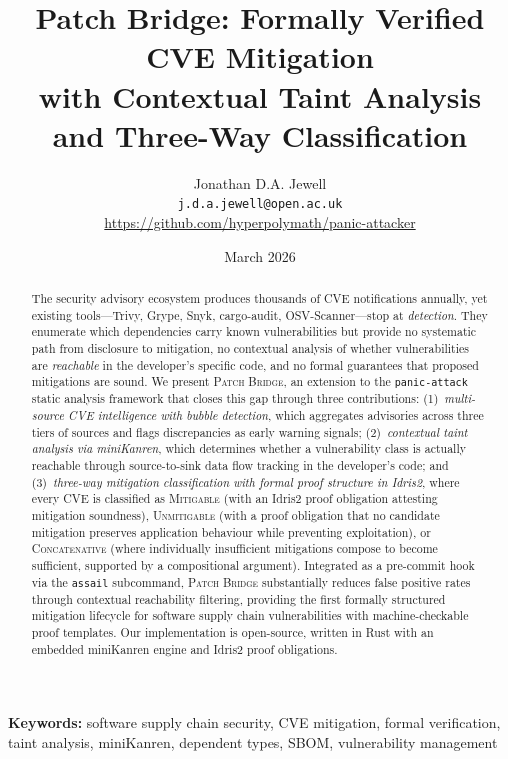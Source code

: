 \documentclass[11pt,twocolumn]{article}
\title{\textbf{Patch Bridge: Formally Verified CVE Mitigation\\
with Contextual Taint Analysis\\and Three-Way Classification}}
\author{
  Jonathan D.A. Jewell\\
  \texttt{j.d.a.jewell@open.ac.uk}\\
  \url{https://github.com/hyperpolymath/panic-attacker}
}
\date{March 2026}
\begin{document}
\maketitle

\begin{abstract}
The security advisory ecosystem produces thousands of CVE notifications
annually, yet existing tools---Trivy, Grype, Snyk, cargo-audit, OSV-Scanner---stop
at \emph{detection}. They enumerate which dependencies carry known
vulnerabilities but provide no systematic path from disclosure to
mitigation, no contextual analysis of whether vulnerabilities are
\emph{reachable} in the developer's specific code, and no formal
guarantees that proposed mitigations are sound. We present \textsc{Patch
Bridge}, an extension to the \texttt{panic-attack} static analysis
framework that closes this gap through three contributions:
(1)~\emph{multi-source CVE intelligence with bubble detection}, which
aggregates advisories across three tiers of sources and flags
discrepancies as early warning signals;
(2)~\emph{contextual taint analysis via miniKanren}, which determines
whether a vulnerability class is actually reachable through
source-to-sink data flow tracking in the developer's code; and
(3)~\emph{three-way mitigation classification with formal proof structure
in Idris2}, where every CVE is classified as \textsc{Mitigable} (with an
Idris2 proof obligation attesting mitigation soundness), \textsc{Unmitigable}
(with a proof obligation that no candidate mitigation preserves application
behaviour while preventing exploitation), or \textsc{Concatenative} (where
individually insufficient mitigations compose to become sufficient, supported
by a compositional argument). Integrated as a pre-commit hook via the
\texttt{assail} subcommand, \textsc{Patch Bridge} substantially reduces
false positive rates through contextual reachability filtering, providing
the first formally structured mitigation lifecycle for software supply
chain vulnerabilities with machine-checkable proof templates. Our implementation is open-source, written in Rust
with an embedded miniKanren engine and Idris2 proof obligations.
\end{abstract}

\noindent\textbf{Keywords:} software supply chain security, CVE
mitigation, formal verification, taint analysis, miniKanren, dependent
types, SBOM, vulnerability management
\end{document}
